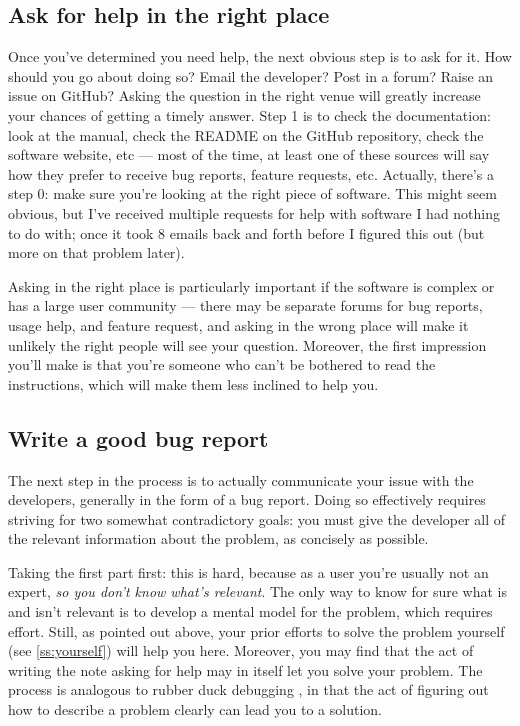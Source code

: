 \documentclass[9pt,training]{livecoms}
\begin{document}
\subsection{Ask for help in the right place}

Once you've determined you need help, the next obvious step is to ask for it.
How should you go about doing so? Email the developer? Post in a forum? Raise an
issue on GitHub? Asking the question in the right venue will greatly increase
your chances of getting a timely answer. Step 1 is to check the documentation:
look at the manual, check the README on the GitHub repository, check the
software website, etc --- most of the time, at least one of these sources will
say how they prefer to receive bug reports, feature requests, etc. Actually,
there's a step 0: make sure you're looking at the right piece of software. This
might seem obvious, but I've received multiple requests for help with software I
had nothing to do with; once it took 8 emails back and forth before I figured
this out (but more on that problem later).

Asking in the right place is particularly important if the software is complex
or has a large user community --- there may be separate forums for bug reports,
usage help, and feature request, and asking in the wrong place will make it
unlikely the right people will see your question. Moreover, the first impression
you'll make is that you're someone who can't be bothered to read the
instructions, which will make them less inclined to help you.

\subsection{Write a good bug report}

The next step in the process is to actually communicate your issue with the
developers, generally in the form of a bug report.  Doing so effectively
requires striving for two somewhat contradictory goals: you must give the
developer all of the relevant information about the problem, as concisely as
possible.

Taking the first part first: this is hard, because as a user you're usually not
an expert, \emph{so you don't know what's relevant}. The only way to know for
sure what is and isn't relevant is to develop a mental model for the problem,
which requires effort. Still, as pointed out above, your prior efforts to solve
the problem yourself (see \ref{ss:yourself}) will help you here.  Moreover, you
may find that the act of writing the note asking for help may in itself let you
solve your problem. The process is analogous to rubber duck debugging
\cite{Thomas-1999}, in that the act of figuring out how to describe a problem
clearly can lead you to a solution.
\end{document}
